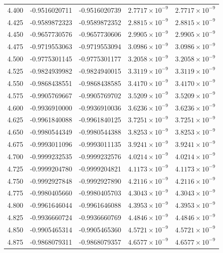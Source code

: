 \documentclass[11pt,a4paper]{article}
\begin{document}
\begin{longtable}{rrrrr}
4.400 & -0.9516020711 & -0.9516020739 & $2.7717\times 10^{-9}$ & $2.7717\times 10^{-9}$ \\
4.425 & -0.9589872323 & -0.9589872352 & $2.8815\times 10^{-9}$ & $2.8815\times 10^{-9}$ \\
4.450 & -0.9657730576 & -0.9657730606 & $2.9905\times 10^{-9}$ & $2.9905\times 10^{-9}$ \\
4.475 & -0.9719553063 & -0.9719553094 & $3.0986\times 10^{-9}$ & $3.0986\times 10^{-9}$ \\
4.500 & -0.9775301145 & -0.9775301177 & $3.2058\times 10^{-9}$ & $3.2058\times 10^{-9}$ \\
4.525 & -0.9824939982 & -0.9824940015 & $3.3119\times 10^{-9}$ & $3.3119\times 10^{-9}$ \\
4.550 & -0.9868438551 & -0.9868438585 & $3.4170\times 10^{-9}$ & $3.4170\times 10^{-9}$ \\
4.575 & -0.9905769667 & -0.9905769702 & $3.5209\times 10^{-9}$ & $3.5209\times 10^{-9}$ \\
4.600 & -0.9936910000 & -0.9936910036 & $3.6236\times 10^{-9}$ & $3.6236\times 10^{-9}$ \\
4.625 & -0.9961840088 & -0.9961840125 & $3.7251\times 10^{-9}$ & $3.7251\times 10^{-9}$ \\
4.650 & -0.9980544349 & -0.9980544388 & $3.8253\times 10^{-9}$ & $3.8253\times 10^{-9}$ \\
4.675 & -0.9993011096 & -0.9993011135 & $3.9241\times 10^{-9}$ & $3.9241\times 10^{-9}$ \\
4.700 & -0.9999232535 & -0.9999232576 & $4.0214\times 10^{-9}$ & $4.0214\times 10^{-9}$ \\
4.725 & -0.9999204780 & -0.9999204821 & $4.1173\times 10^{-9}$ & $4.1173\times 10^{-9}$ \\
4.750 & -0.9992927848 & -0.9992927890 & $4.2116\times 10^{-9}$ & $4.2116\times 10^{-9}$ \\
4.775 & -0.9980405660 & -0.9980405703 & $4.3043\times 10^{-9}$ & $4.3043\times 10^{-9}$ \\
4.800 & -0.9961646044 & -0.9961646088 & $4.3953\times 10^{-9}$ & $4.3953\times 10^{-9}$ \\
4.825 & -0.9936660724 & -0.9936660769 & $4.4846\times 10^{-9}$ & $4.4846\times 10^{-9}$ \\
4.850 & -0.9905465314 & -0.9905465360 & $4.5721\times 10^{-9}$ & $4.5721\times 10^{-9}$ \\
4.875 & -0.9868079311 & -0.9868079357 & $4.6577\times 10^{-9}$ & $4.6577\times 10^{-9}$ \\

\end{longtable}
\end{document}
